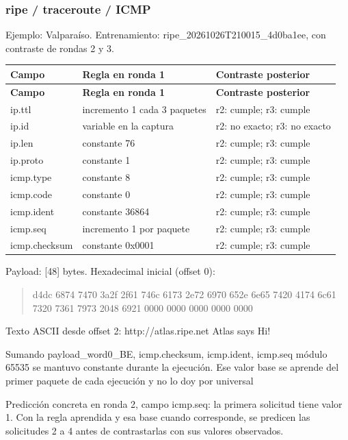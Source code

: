 \subsubsection{ripe / traceroute / ICMP}
Ejemplo: Valparaíso. Entrenamiento: ripe\_\allowbreak{}20261026T210015\_\allowbreak{}4d0ba1ee, con contraste de rondas 2 y 3.

\begingroup
\fontsize{9}{11}\selectfont
\addtocounter{table}{-1}
\begin{longtable}{p{3.1cm}p{5.8cm}p{5.1cm}}
\toprule
\textbf{Campo} & \textbf{Regla en ronda 1} & \textbf{Contraste posterior} \\ \midrule
\endfirsthead
\toprule
\textbf{Campo} & \textbf{Regla en ronda 1} & \textbf{Contraste posterior} \\ \midrule
\endhead
ip.ttl & incremento 1 cada 3 paquetes & r2: cumple; r3: cumple \\
ip.id & variable en la captura & r2: no exacto; r3: no exacto \\
ip.len & constante 76 & r2: cumple; r3: cumple \\
ip.proto & constante 1 & r2: cumple; r3: cumple \\
icmp.type & constante 8 & r2: cumple; r3: cumple \\
icmp.code & constante 0 & r2: cumple; r3: cumple \\
icmp.ident & constante 36864 & r2: cumple; r3: cumple \\
icmp.seq & incremento 1 por paquete & r2: cumple; r3: cumple \\
icmp.checksum & constante 0x0001 & r2: cumple; r3: cumple \\
\bottomrule
\end{longtable}
\endgroup
Payload: [48] bytes. Hexadecimal inicial (offset 0):

\begin{quote}\ttfamily\footnotesize\raggedright d4dc 6874 7470 3a2f 2f61 746c 6173 2e72 6970 652e 6e65 7420 4174 6c61 7320 7361 7973 2048 6921 0000 0000 0000 0000 0000\end{quote}
Texto ASCII desde offset 2: http://atlas.ripe.net Atlas says Hi!

Sumando payload\_\allowbreak{}word0\_\allowbreak{}BE, icmp.checksum, icmp.ident, icmp.seq módulo 65535 se mantuvo constante durante la ejecución. Ese valor base se aprende del primer paquete de cada ejecución y no lo doy por universal

Predicción concreta en ronda 2, campo icmp.seq: la primera solicitud tiene valor 1. Con la regla aprendida y esa base cuando corresponde, se predicen las solicitudes 2 a 4 antes de contrastarlas con sus valores observados.

